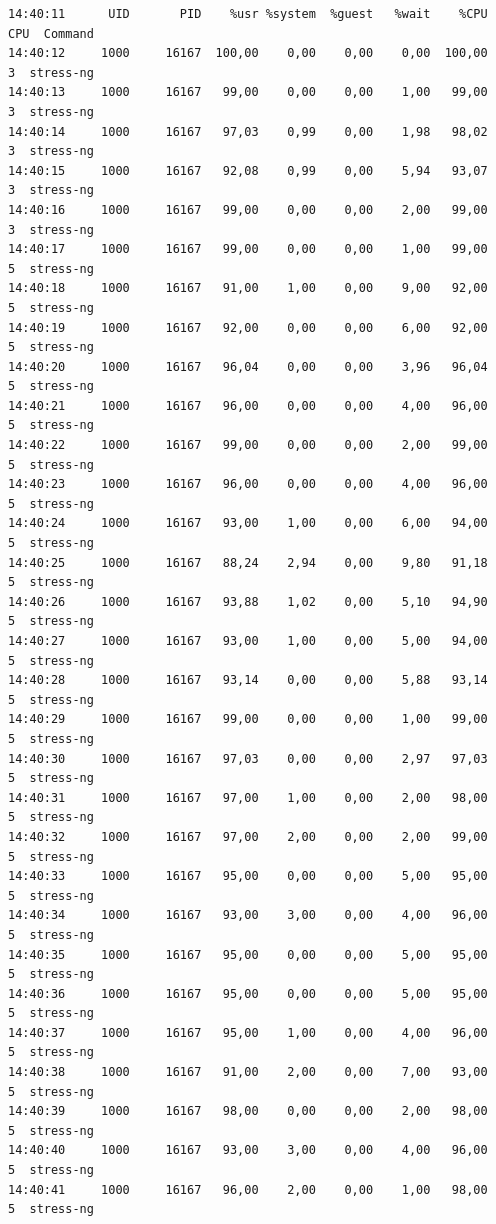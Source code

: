 \documentclass[12pt,onecolumn]{article}
\begin{document}
\begin{verbatim}
14:40:11      UID       PID    %usr %system  %guest   %wait    %CPU   CPU  Command
14:40:12     1000     16167  100,00    0,00    0,00    0,00  100,00     3  stress-ng
14:40:13     1000     16167   99,00    0,00    0,00    1,00   99,00     3  stress-ng
14:40:14     1000     16167   97,03    0,99    0,00    1,98   98,02     3  stress-ng
14:40:15     1000     16167   92,08    0,99    0,00    5,94   93,07     3  stress-ng
14:40:16     1000     16167   99,00    0,00    0,00    2,00   99,00     3  stress-ng
14:40:17     1000     16167   99,00    0,00    0,00    1,00   99,00     5  stress-ng
14:40:18     1000     16167   91,00    1,00    0,00    9,00   92,00     5  stress-ng
14:40:19     1000     16167   92,00    0,00    0,00    6,00   92,00     5  stress-ng
14:40:20     1000     16167   96,04    0,00    0,00    3,96   96,04     5  stress-ng
14:40:21     1000     16167   96,00    0,00    0,00    4,00   96,00     5  stress-ng
14:40:22     1000     16167   99,00    0,00    0,00    2,00   99,00     5  stress-ng
14:40:23     1000     16167   96,00    0,00    0,00    4,00   96,00     5  stress-ng
14:40:24     1000     16167   93,00    1,00    0,00    6,00   94,00     5  stress-ng
14:40:25     1000     16167   88,24    2,94    0,00    9,80   91,18     5  stress-ng
14:40:26     1000     16167   93,88    1,02    0,00    5,10   94,90     5  stress-ng
14:40:27     1000     16167   93,00    1,00    0,00    5,00   94,00     5  stress-ng
14:40:28     1000     16167   93,14    0,00    0,00    5,88   93,14     5  stress-ng
14:40:29     1000     16167   99,00    0,00    0,00    1,00   99,00     5  stress-ng
14:40:30     1000     16167   97,03    0,00    0,00    2,97   97,03     5  stress-ng
14:40:31     1000     16167   97,00    1,00    0,00    2,00   98,00     5  stress-ng
14:40:32     1000     16167   97,00    2,00    0,00    2,00   99,00     5  stress-ng
14:40:33     1000     16167   95,00    0,00    0,00    5,00   95,00     5  stress-ng
14:40:34     1000     16167   93,00    3,00    0,00    4,00   96,00     5  stress-ng
14:40:35     1000     16167   95,00    0,00    0,00    5,00   95,00     5  stress-ng
14:40:36     1000     16167   95,00    0,00    0,00    5,00   95,00     5  stress-ng
14:40:37     1000     16167   95,00    1,00    0,00    4,00   96,00     5  stress-ng
14:40:38     1000     16167   91,00    2,00    0,00    7,00   93,00     5  stress-ng
14:40:39     1000     16167   98,00    0,00    0,00    2,00   98,00     5  stress-ng
14:40:40     1000     16167   93,00    3,00    0,00    4,00   96,00     5  stress-ng
14:40:41     1000     16167   96,00    2,00    0,00    1,00   98,00     5  stress-ng

\end{verbatim}
\end{document}
